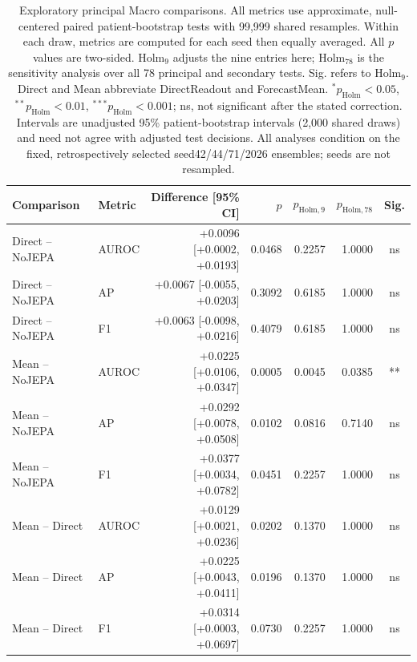 \begin{table}[t]
\centering
\small
\caption{Exploratory principal Macro comparisons. All metrics use approximate, null-centered paired patient-bootstrap tests with 99,999 shared resamples. Within each draw, metrics are computed for each seed then equally averaged. All $p$ values are two-sided. Holm$_9$ adjusts the nine entries here; Holm$_{78}$ is the sensitivity analysis over all 78 principal and secondary tests. Sig. refers to Holm$_9$. Direct and Mean abbreviate DirectReadout and ForecastMean. $^{*}p_{\mathrm{Holm}}<0.05$, $^{**}p_{\mathrm{Holm}}<0.01$, $^{***}p_{\mathrm{Holm}}<0.001$; ns, not significant after the stated correction. Intervals are unadjusted 95\% patient-bootstrap intervals (2,000 shared draws) and need not agree with adjusted test decisions. All analyses condition on the fixed, retrospectively selected seed42/44/71/2026 ensembles; seeds are not resampled.}
\label{tab:bootstrap}
\begin{tabular}{llrrrrc}
\toprule
Comparison & Metric & Difference [95\% CI] & $p$ & $p_{\mathrm{Holm},9}$ & $p_{\mathrm{Holm},78}$ & Sig. \\
\midrule
Direct -- NoJEPA & AUROC & +0.0096 [+0.0002, +0.0193] & 0.0468 & 0.2257 & 1.0000 & ns \\
Direct -- NoJEPA & AP & +0.0067 [-0.0055, +0.0203] & 0.3092 & 0.6185 & 1.0000 & ns \\
Direct -- NoJEPA & F1 & +0.0063 [-0.0098, +0.0216] & 0.4079 & 0.6185 & 1.0000 & ns \\
Mean -- NoJEPA & AUROC & +0.0225 [+0.0106, +0.0347] & 0.0005 & 0.0045 & 0.0385 & ** \\
Mean -- NoJEPA & AP & +0.0292 [+0.0078, +0.0508] & 0.0102 & 0.0816 & 0.7140 & ns \\
Mean -- NoJEPA & F1 & +0.0377 [+0.0034, +0.0782] & 0.0451 & 0.2257 & 1.0000 & ns \\
Mean -- Direct & AUROC & +0.0129 [+0.0021, +0.0236] & 0.0202 & 0.1370 & 1.0000 & ns \\
Mean -- Direct & AP & +0.0225 [+0.0043, +0.0411] & 0.0196 & 0.1370 & 1.0000 & ns \\
Mean -- Direct & F1 & +0.0314 [+0.0003, +0.0697] & 0.0730 & 0.2257 & 1.0000 & ns \\
\bottomrule
\end{tabular}
\end{table}
